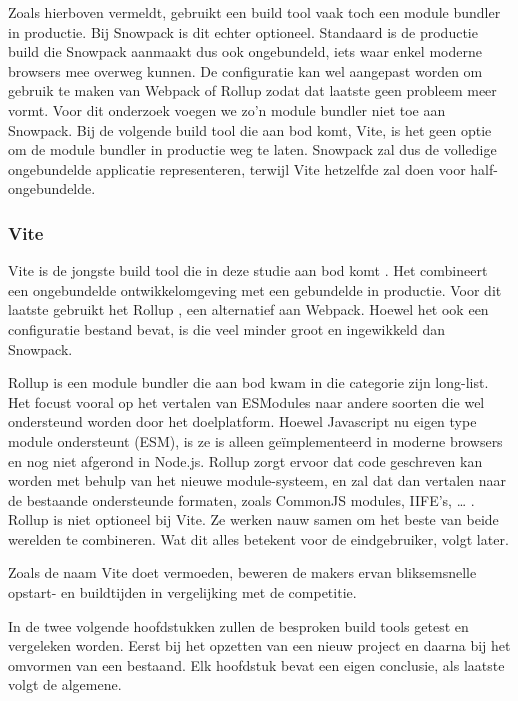 Zoals hierboven vermeldt, gebruikt een build tool vaak toch een module bundler in productie. Bij Snowpack is dit echter optioneel. Standaard is de productie build die Snowpack aanmaakt dus ook ongebundeld, iets waar enkel moderne browsers mee overweg kunnen. De configuratie kan wel aangepast worden om gebruik te maken van Webpack of Rollup zodat dat laatste geen probleem meer vormt. Voor dit onderzoek voegen we zo’n module bundler niet toe aan Snowpack. Bij de volgende build tool die aan bod komt, Vite, is het geen optie om de module bundler in productie weg te laten. Snowpack zal dus de volledige ongebundelde applicatie representeren, terwijl Vite hetzelfde zal doen voor half-ongebundelde.

\subsubsection{Vite}
Vite is de jongste build tool die in deze studie aan bod komt \autocite{vite-2020}. Het combineert een ongebundelde ontwikkelomgeving met een gebundelde in productie. Voor dit laatste gebruikt het Rollup \autocite{vite-no-date}, een alternatief aan Webpack. Hoewel het ook een configuratie bestand bevat, is die veel minder groot en ingewikkeld dan Snowpack. 

Rollup is een module bundler die aan bod kwam in die categorie zijn long-list. Het focust vooral op het vertalen van ESModules naar andere soorten die wel ondersteund worden door het doelplatform. Hoewel Javascript nu eigen type module ondersteunt (ESM), is ze is alleen geïmplementeerd in moderne browsers en nog niet afgerond in Node.js. Rollup zorgt ervoor dat code geschreven kan worden met behulp van het nieuwe module-systeem, en zal dat dan vertalen naar de bestaande ondersteunde formaten, zoals CommonJS modules, IIFE’s, … . Rollup is niet optioneel bij Vite. Ze werken nauw samen om het beste van beide werelden te combineren. Wat dit alles betekent voor de eindgebruiker, volgt later.

Zoals de naam Vite doet vermoeden, beweren de makers ervan bliksemsnelle opstart- en buildtijden in vergelijking met de competitie.


In de twee volgende hoofdstukken zullen de besproken build tools getest en vergeleken worden. Eerst bij het opzetten van een nieuw project en daarna bij het omvormen van een bestaand. Elk hoofdstuk bevat een eigen conclusie, als laatste volgt de algemene.

